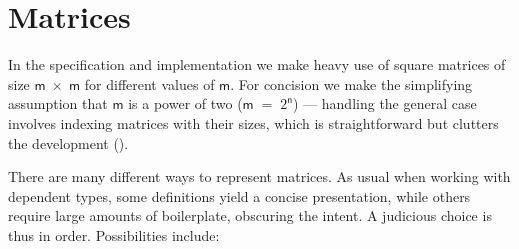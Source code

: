 \documentclass{CSML}
\numberwithin{theorem}{section}
\newcommand{\Varid}[1]{\mathit{#1}}
\renewcommand\Varid[1]{\ensuremath{\mathsf{#1}}}
\begin{document}
\section{Matrices}\label{sec:matrices}

In the specification and implementation we  make heavy use of
square matrices of size \ensuremath{\Varid{m}\;\mathbin{\!\times\!}\;\Varid{m}} for different values of \ensuremath{\Varid{m}}.
For concision we make the simplifying assumption that \ensuremath{\Varid{m}} is a power
of two (\ensuremath{\Varid{m}\;\mathrel{=}\;2^\Varid{n}}) --- handling the general case involves indexing
matrices with their sizes, which is straightforward but clutters the
development ().

There are many different ways to represent matrices.
As usual when working with dependent types, some definitions yield a
concise presentation, while others require large amounts of
boilerplate, obscuring the intent.
A judicious choice is thus in order. Possibilities include:
\end{document}
